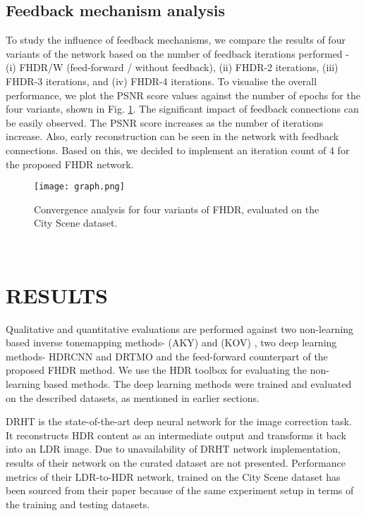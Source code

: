 \documentclass[conference]{IEEEtran}
\begin{document}
\subsection{Feedback mechanism analysis}
To study the influence of feedback mechanisms, we compare the results of four variants of the network based on the number of feedback iterations performed - (i) FHDR/W (feed-forward / without feedback), (ii) FHDR-2 iterations, (iii) FHDR-3 iterations, and (iv) FHDR-4 iterations. To visualise the overall performance, we plot the PSNR score values against the number of epochs for the four variants, shown in Fig. \ref{fig4}. The significant impact of feedback connections can be easily observed. The PSNR score increases as the number of iterations increase. Also, early reconstruction can be seen in the network with feedback connections. Based on this, we decided to implement an iteration count of 4 for the proposed FHDR network.
\begin{figure}[htbp]
\centering
\texttt{[image: graph.png]}
\caption{Convergence analysis for four variants of FHDR, evaluated on the City Scene dataset.}
\label{fig4}
\end{figure}\\[-4ex]

\section{RESULTS}
Qualitative and quantitative evaluations are performed against two non-learning based inverse tonemapping methods- (AKY) \cite{akyuz2007hdr} and (KOV) \cite{kovaleski2014high}, two deep learning methods- HDRCNN \cite{eilertsen2017hdr} and DRTMO \cite{endo2017deep} and the feed-forward counterpart of the proposed FHDR method. We use the HDR toolbox \cite{banterle2017advanced} for evaluating the non-learning based methods. 
The deep learning methods were trained and evaluated on the described datasets, as mentioned in earlier sections. 

DRHT \cite{yang2018image} is the state-of-the-art deep neural network for the image correction task. It reconstructs HDR content as an intermediate output and transforms it back into an LDR image. Due to unavailability of DRHT network implementation, results of their network on the curated dataset are not presented. Performance metrics of their LDR-to-HDR network, trained on the City Scene dataset has been sourced from their paper because of the same experiment setup in terms of the training and testing datasets.
\end{document}
